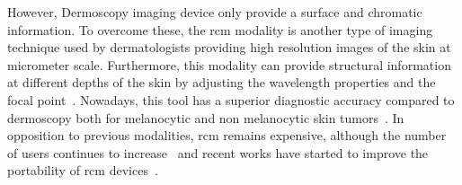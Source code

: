 \documentclass[journal,article,submit,moreauthors,pdftex, applsci]{Definitions/mdpi}
\begin{document}
However, Dermoscopy imaging device only provide a surface and chromatic information. To overcome these, the \ac{rcm} modality is another type of imaging technique used by dermatologists providing high resolution images of the skin at micrometer scale. Furthermore, this modality can provide structural information at different depths of the skin by adjusting the wavelength properties and the focal point~\cite{Kolm2012}. Nowadays, this tool has a superior diagnostic accuracy compared to dermoscopy both for melanocytic and non melanocytic skin tumors~\cite{Haroon2017, Dinnes2018, Lupu2019}. In opposition to previous modalities, \ac{rcm} remains expensive, although the number of users continues to increase~\cite{Batta2015} and recent works have started to improve the portability of \ac{rcm} devices~\cite{Freeman2018}.\par
\end{document}
